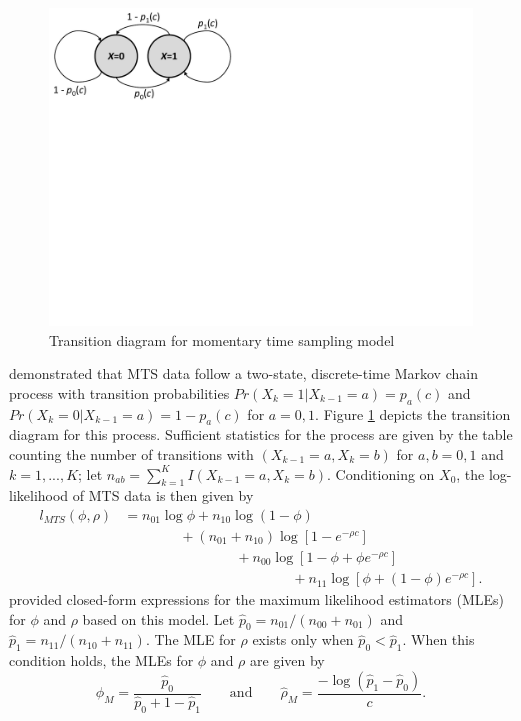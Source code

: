 \documentclass[man, noextraspace, floatsintext]{apa6}\usepackage[]{graphicx}\usepackage[]{color}
\begin{document}
\begin{figure}[tbp]
\centering
\includegraphics[clip=true, trim= 0 380 400 00, width=0.5\linewidth]{ppt/MTS_transitions.pdf}
\caption{Transition diagram for momentary time sampling model}
\label{fig:MTS_transitions}
\end{figure}  

\citet{Brown1977estimation} demonstrated that MTS data follow a two-state, discrete-time Markov chain process with transition probabilities $Pr(X_k = 1 | X_{k-1} = a) = p_a(c)$ and $Pr(X_k = 0 | X_{k-1} = a) = 1 - p_a(c)$ for $a = 0,1$. 
Figure \ref{fig:MTS_transitions} depicts the transition diagram for this process.
Sufficient statistics for the process are given by the table counting the number of transitions with $(X_{k-1} = a, X_k = b)$ for $a,b = 0,1$ and $k = 1,...,K$; let $n_{ab} = \sum_{k=1}^{K} I(X_{k-1} = a, X_k = b)$. 
Conditioning on $X_0$, the log-likelihood of MTS data is then given by \begin{equation}
\begin{aligned}
\label{eq:MTS_loglik}
l_{MTS}(\phi, \rho) &= n_{01} \log \phi + n_{10} \log\left(1 - \phi\right) \\
& \qquad \qquad + \left(n_{01} + n_{10}\right) \log \left[1 - e^{-\rho c}\right] \\
& \qquad \qquad \qquad \qquad + n_{00} \log\left[1 - \phi + \phi e^{-\rho c}\right]\\
& \qquad \qquad \qquad \qquad \qquad \qquad + n_{11}\log\left[\phi + \left(1 - \phi\right)e^{-\rho c}\right].
\end{aligned}
\end{equation}
\citet{Brown1977estimation} provided closed-form expressions for the maximum likelihood estimators (MLEs) for $\phi$ and $\rho$ based on this model. Let $\hat{p}_0 = n_{01}/ \left(n_{00} + n_{01}\right)$ and $\hat{p}_1 = n_{11} / \left(n_{10} + n_{11}\right)$. The MLE for $\rho$ exists only when $\hat{p}_0 < \hat{p}_1$. 
When this condition holds, the MLEs for $\phi$ and $\rho$ are given by 
\begin{equation}
\label{eq:MTS_mle}
\hat\phi_{M} = \frac{\hat{p}_0}{\hat{p}_0 + 1 - \hat{p}_1} \qquad \text{and} \qquad
\hat\rho_{M} = \frac{- \log(\hat{p}_1 - \hat{p}_0)}{c}.
\end{equation}
\end{document}

